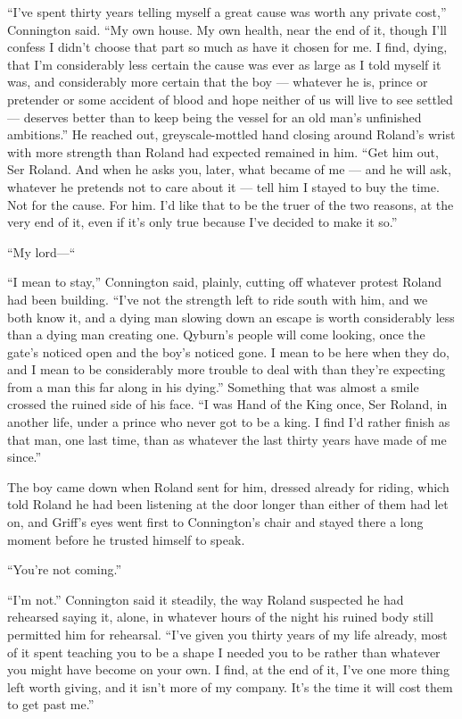 “I’ve spent thirty years telling myself a great cause was worth any private cost,” Connington said. “My own house. My own health, near the end of it, though I’ll confess I didn’t choose that part so much as have it chosen for me. I find, dying, that I’m considerably less certain the cause was ever as large as I told myself it was, and considerably more certain that the boy — whatever he is, prince or pretender or some accident of blood and hope neither of us will live to see settled — deserves better than to keep being the vessel for an old man’s unfinished ambitions.” He reached out, greyscale-mottled hand closing around Roland’s wrist with more strength than Roland had expected remained in him. “Get him out, Ser Roland. And when he asks you, later, what became of me — and he will ask, whatever he pretends not to care about it — tell him I stayed to buy the time. Not for the cause. For him. I’d like that to be the truer of the two reasons, at the very end of it, even if it’s only true because I’ve decided to make it so.”

“My lord—“

“I mean to stay,” Connington said, plainly, cutting off whatever protest Roland had been building. “I’ve not the strength left to ride south with him, and we both know it, and a dying man slowing down an escape is worth considerably less than a dying man creating one. Qyburn’s people will come looking, once the gate’s noticed open and the boy’s noticed gone. I mean to be here when they do, and I mean to be considerably more trouble to deal with than they’re expecting from a man this far along in his dying.” Something that was almost a smile crossed the ruined side of his face. “I was Hand of the King once, Ser Roland, in another life, under a prince who never got to be a king. I find I’d rather finish as that man, one last time, than as whatever the last thirty years have made of me since.”

\sceneBreak

The boy came down when Roland sent for him, dressed already for riding, which told Roland he had been listening at the door longer than either of them had let on, and Griff’s eyes went first to Connington’s chair and stayed there a long moment before he trusted himself to speak.

“You’re not coming.”

“I’m not.” Connington said it steadily, the way Roland suspected he had rehearsed saying it, alone, in whatever hours of the night his ruined body still permitted him for rehearsal. “I’ve given you thirty years of my life already, most of it spent teaching you to be a shape I needed you to be rather than whatever you might have become on your own. I find, at the end of it, I’ve one more thing left worth giving, and it isn’t more of my company. It’s the time it will cost them to get past me.”

